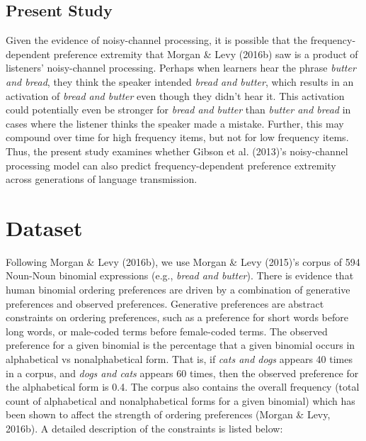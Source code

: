 \documentclass[10pt, letterpaper]{article}
\begin{document}
\hypertarget{present-study}{%
\subsection{Present Study}\label{present-study}}

Given the evidence of noisy-channel processing, it is possible that the
frequency-dependent preference extremity that Morgan \& Levy (2016b) saw
is a product of listeners' noisy-channel processing. Perhaps when
learners hear the phrase \emph{butter and bread}, they think the speaker
intended \emph{bread and butter}, which results in an activation of
\emph{bread and butter} even though they didn't hear it. This activation
could potentially even be stronger for \emph{bread and butter} than
\emph{butter and bread} in cases where the listener thinks the speaker
made a mistake. Further, this may compound over time for high frequency
items, but not for low frequency items. Thus, the present study examines
whether Gibson et al. (2013)'s noisy-channel processing model can also
predict frequency-dependent preference extremity across generations of
language transmission.

\hypertarget{dataset}{%
\section{Dataset}\label{dataset}}

Following Morgan \& Levy (2016b), we use Morgan \& Levy (2015)'s corpus
of 594 Noun-Noun binomial expressions (e.g., \emph{bread and butter}).
There is evidence that human binomial ordering preferences are driven by
a combination of generative preferences and observed preferences.
Generative preferences are abstract constraints on ordering preferences,
such as a preference for short words before long words, or male-coded
terms before female-coded terms. The observed preference for a given
binomial is the percentage that a given binomial occurs in alphabetical
vs nonalphabetical form. That is, if \emph{cats and dogs} appears 40
times in a corpus, and \emph{dogs and cats} appears 60 times, then the
observed preference for the alphabetical form is 0.4. The corpus also
contains the overall frequency (total count of alphabetical and
nonalphabetical forms for a given binomial) which has been shown to
affect the strength of ordering preferences (Morgan \& Levy, 2016b). A
detailed description of the constraints is listed below:
\end{document}

